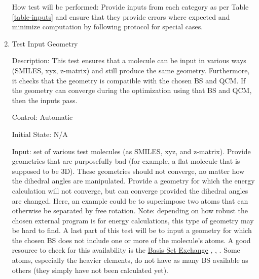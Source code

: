 \documentclass[12pt, titlepage]{article}
\begin{document}
\begin{enumerate}

How test will be performed: Provide inputs from each category as per Table 
\ref{table-inputs} and ensure that they provide errors where expected and 
minimize computation by following protocol for special cases.

\item Test Input Geometry \label{test-input-geom}

Description: This test ensures that a molecule can be input in various ways 
(SMILES, xyz, z-matrix) and still produce the same geometry. Furthermore, it 
checks that the geometry is compatible with the chosen BS and QCM. If the 
geometry can converge during the optimization using that BS and QCM, then the 
inputs pass.

Control: Automatic

Initial State: N/A

Input: set of various test molecules (as SMILES, xyz, and z-matrix). Provide 
geometries that are purposefully bad (for example, a flat molecule that is 
supposed to be 3D). These geometries should not converge, no matter how the 
dihedral angles are manipulated. Provide a geometry for which the energy 
calculation will not converge, but can converge provided the dihedral angles 
are changed. Here, an example could be to superimpose two atoms that can 
otherwise be separated by free rotation. Note: depending on how robust the 
chosen external program is for energy calculations, this type of geometry may 
be hard to find. A last part of this test will be to input a geometry for which 
the chosen BS does not include one or more of the molecule's atoms. A 
good resource to check for this availability is the 
\href{https://bse.pnl.gov/bse/portal}{Basis Set Exchange}  
\cite{basis-set-exchange-ref1}, \cite{basis-set-exchange-ref2}, 
\cite{basis-set-exchange-web}.
 Some atoms, 
especially the heavier elements, do not have as many BS available as others 
(they simply have not been calculated yet).  


\end{enumerate}
\end{document}
